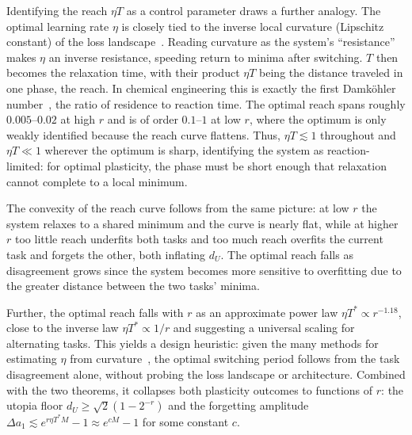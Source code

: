 \documentclass[pmlr]{jmlr} %
\begin{document}
Identifying the reach $\eta T$ as a control parameter draws a further analogy. The optimal learning rate $\eta$ is closely tied to the inverse local curvature (Lipschitz constant) of the loss landscape~\citep{relaxlr26, edgestability21}. Reading curvature as the system's ``resistance'' makes $\eta$ an inverse resistance, speeding return to minima after switching. $T$ then becomes the relaxation time, with their product $\eta T$ being the distance traveled in one phase, the reach. In chemical engineering this is exactly the first Damköhler number~\citep{levenspiel1999}, the ratio of residence to reaction time. The optimal reach spans roughly $0.005$--$0.02$ at high $r$ and is of order $0.1$--$1$ at low $r$, where the optimum is only weakly identified because the reach curve flattens. Thus, $\eta T \lesssim 1$ throughout and $\eta T \ll 1$ wherever the optimum is sharp, identifying the system as reaction-limited: for optimal plasticity, the phase must be short enough that relaxation cannot complete to a local minimum.

The convexity of the reach curve follows from the same picture: at low $r$ the system relaxes to a shared minimum and the curve is nearly flat, while at higher $r$ too little reach underfits both tasks and too much reach overfits the current task and forgets the other, both inflating $d_U$. The optimal reach falls as disagreement grows since the system becomes more sensitive to overfitting due to the greater distance between the two tasks' minima.

Further, the optimal reach falls with $r$ as an approximate power law $\eta T^{*}\propto r^{-1.18}$, close to the inverse law $\eta T^{*}\propto 1/r$ and suggesting a universal scaling for alternating tasks. This yields a design heuristic: given the many methods for estimating $\eta$ from curvature~\citep{relaxlr26, edgestability21}, the optimal switching period follows from the task disagreement alone, without probing the loss landscape or architecture. Combined with the two theorems, it collapses both plasticity outcomes to functions of $r$: the utopia floor $d_U \geq \sqrt{2}(1-2^{-r})$ and the forgetting amplitude $\Delta a_1 \lesssim e^{r\eta T^{*}M}-1 \approx e^{c M}-1$ for some constant $c$.
\end{document}
